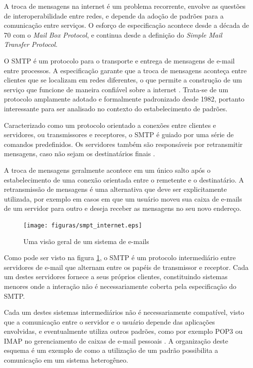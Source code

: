 A troca de mensagens na internet é um problema recorrente, envolve as questões de
interoperabilidade entre redes, e depende da adoção de padrões para a comunicação
entre serviços. O esforço de especificação acontece desde a década de 70 com o
\textit{Mail Box Protocol}, e continua desde a definição do \textit{Simple Mail
Transfer Protocol}.

O SMTP é um protocolo para o transporte e entrega de mensagens de e-mail entre
processos. A especificação garante que a troca de mensagens aconteça entre clientes
que se localizam em redes diferentes, o que permite a construção de um serviço que
funcione de maneira confiável sobre a internet \cite{rfc2821}. Trata-se de um
protocolo amplamente adotado e formalmente padronizado desde 1982, portanto
interessante para ser analisado no contexto do estabelecimento de padrões.

Caracterizado como um protocolo orientado a conexões entre clientes e servidores, ou
transmissores e receptores, o SMTP é guiado por uma série de comandos predefinidos.
Os servidores também são responsáveis por retransmitir mensagens, caso não sejam os
destinatários finais \cite{kurose2012}.

A troca de mensagens geralmente acontece em um único salto após o estabelecimento de
uma conexão orientada entre o remetente e o destinatário. A retransmissão de
mensagens é uma alternativa que deve ser explicitamente utilizada, por exemplo em
casos em que um usuário moveu sua caixa de e-mails de um servidor para outro e
deseja receber as mensagens no seu novo endereço.

\begin{figure}[h]
	\centering
		\texttt{[image: figuras/smpt\_internet.eps]}
	\caption{Uma visão geral de um sistema de e-mails \cite{kurose2012}}
	\label{fig:smtpInternet}
\end{figure}

Como pode ser visto na figura \ref{fig:smtpInternet}, o SMTP é um protocolo
intermediário entre servidores de e-mail que alternam entre os papéis de transmissor
e receptor. Cada um destes servidores fornece a seus próprios clientes, constituindo
sistemas menores onde a interação não é necessariamente coberta pela especificação
do SMTP.

Cada um destes sistemas intermediários não é necessariamente compatível, visto que a
comunicação entre o servidor e o usuário depende das aplicações envolvidas, e
eventualmente utiliza outros padrões, como por exemplo POP3 ou IMAP no gerenciamento
de caixas de e-mail pessoais \cite{tanenbaum2010}. A organização deste esquema é um
exemplo de como a utilização de um padrão possibilita a comunicação em um sistema
heterogêneo.

